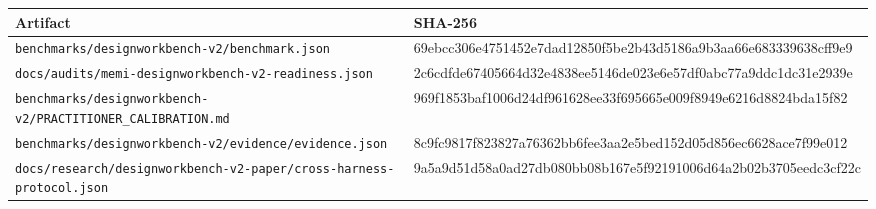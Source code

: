 \begin{tabularx}{\textwidth}{@{}X>{\ttfamily\tiny\raggedright\arraybackslash}p{}@{}}
\toprule
Artifact & SHA-256 \\
\midrule
\nolinkurl{benchmarks/designworkbench-v2/benchmark.json} & 69ebcc306e4751452e7dad12850f5be2b43d5186a9b3aa66e683339638cff9e9 \\
\nolinkurl{docs/audits/memi-designworkbench-v2-readiness.json} & 2c6cdfde67405664d32e4838ee5146de023e6e57df0abc77a9ddc1dc31e2939e \\
\nolinkurl{benchmarks/designworkbench-v2/PRACTITIONER_CALIBRATION.md} & 969f1853baf1006d24df961628ee33f695665e009f8949e6216d8824bda15f82 \\
\nolinkurl{benchmarks/designworkbench-v2/evidence/evidence.json} & 8c9fc9817f823827a76362bb6fee3aa2e5bed152d05d856ec6628ace7f99e012 \\
\nolinkurl{docs/research/designworkbench-v2-paper/cross-harness-protocol.json} & 9a5a9d51d58a0ad27db080bb08b167e5f92191006d64a2b02b3705eedc3cf22c \\
\bottomrule
\end{tabularx}
